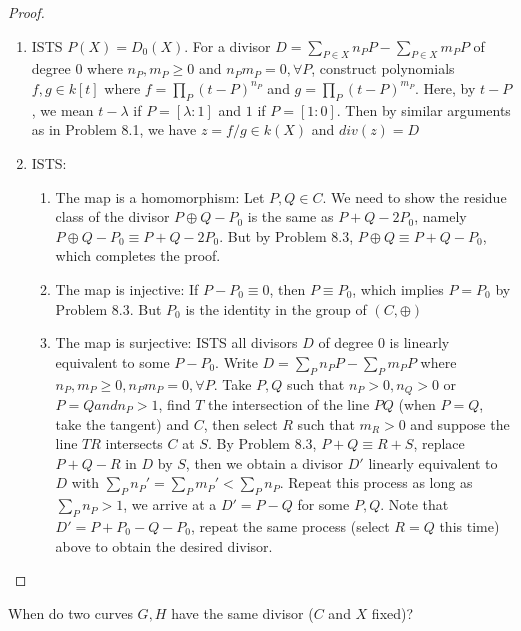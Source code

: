 \documentclass{solution}
\begin{document}
\begin{proof}
    \begin{enumerate}
        \item ISTS $P(X) = D_0(X)$. For a divisor $D = \sum\limits_{P \in X} n_P P - \sum\limits_{P \in X} m_P P$ of degree $0$ where $n_P, m_P \ge 0$ and $n_Pm_P = 0, \forall P$, construct polynomials $f, g \in k[t]$ where $f = \prod\limits_{P} (t - P)^{n_P}$ and $g = \prod\limits_{P} (t - P)^{m_P}$. Here, by $t - P$, we mean $t - \lambda$ if $P = [\lambda:1]$ and $1$ if $P = [1:0]$. Then by similar arguments as in Problem 8.1, we have $z = f / g \in k(X)$ and $div(z) = D$
        \item ISTS:
        \begin{enumerate}
            \item The map is a homomorphism: Let $P, Q \in C$. We need to show the residue class of the divisor $P \oplus Q - P_0$ is the same as $P + Q - 2P_0$, namely $P \oplus Q - P_0 \equiv P + Q - 2P_0$. But by Problem 8.3, $P \oplus Q \equiv P + Q - P_0$, which completes the proof.
            \item The map is injective: If $P - P_0 \equiv 0$, then $P \equiv P_0$, which implies $P = P_0$ by Problem 8.3. But $P_0$ is the identity in the group of $(C, \oplus)$
            \item The map is surjective: ISTS all divisors $D$ of degree $0$ is linearly equivalent to some $P - P_0$. Write $D = \sum\limits_{P} n_P P - \sum\limits_{P} m_P P$ where $n_P, m_P \ge 0, n_Pm_P = 0, \forall P$. Take $P, Q$ such that $n_P \gt 0, n_Q \gt 0$ or $P = Q and n_P \gt 1$, find $T$ the intersection of the line $PQ$ (when $P = Q$, take the tangent) and $C$, then select $R$ such that $m_R \gt 0$ and suppose the line $TR$ intersects $C$ at $S$. By Problem 8.3, $P + Q \equiv R + S$, replace $P + Q - R$ in $D$ by $S$, then we obtain a divisor $D'$ linearly equivalent to $D$ with $\sum\limits_{P} n_P' = \sum\limits_{P} m_P' \lt \sum\limits_{P} n_P$. Repeat this process as long as $\sum\limits_{P} n_P \gt 1$, we arrive at a $D' = P - Q$ for some $P, Q$. Note that $D' = P + P_0 - Q - P_0$, repeat the same process (select $R = Q$ this time) above to obtain the desired divisor.
        \end{enumerate}
    \end{enumerate}
\end{proof}

\begin{problem}{8.7}
    When do two curves $G, H$ have the same divisor ($C$ and $X$ fixed)?
\end{problem}
\end{document}
